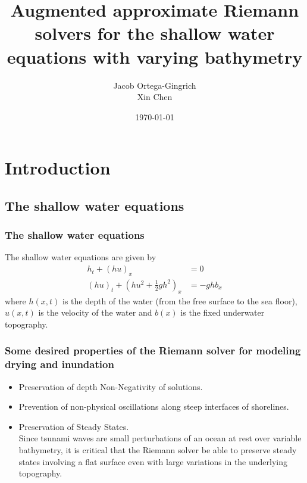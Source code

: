 \documentclass{beamer}
\title{Augmented approximate Riemann solvers for the shallow water equations with varying bathymetry}
\author{Jacob Ortega-Gingrich\\ Xin Chen}
\date{\today}
\begin{document}
\frame{\titlepage}


\section[Outline]{}

\section{Introduction}
\subsection{The shallow water equations}

\frame
{
 \frametitle{The shallow water equations}
 The shallow water equations are given by
 \begin{align*}
h_t+(h u)_x&=0\\
(h u)_t+\left(h u^2+\frac{1}{2} g h^2\right)_x&=-g h b_x
\end{align*}
where $h(x,t)$ is the depth of the water (from the free surface to the sea floor), $u(x,t)$ is the velocity of the water and $b(x)$ is the fixed underwater topography.
}

\frame
{
\frametitle{Some desired properties of the Riemann solver for modeling drying and inundation}
\begin{itemize}
\item<1-> Preservation of depth Non-Negativity of solutions.
\item<2-> Prevention of non-physical oscillations along steep interfaces of shorelines.
\item<3-> Preservation of Steady States. \\
Since tsunami waves are small perturbations of an ocean at rest over variable bathymetry, it is critical that the Riemann solver be able to preserve steady states involving a flat surface even with large variations in the underlying topography.
\end{itemize}
}
\end{document}
